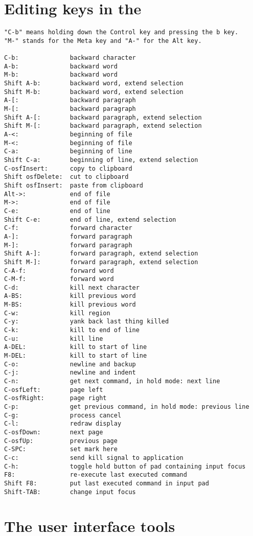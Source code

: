 \chapter{Editing keys in the \IP}
\begin{verbatim}
"C-b" means holding down the Control key and pressing the b key.
"M-" stands for the Meta key and "A-" for the Alt key.

C-b:              backward character
A-b:              backward word
M-b:              backward word
Shift A-b:        backward word, extend selection
Shift M-b:        backward word, extend selection
A-[:              backward paragraph
M-[:              backward paragraph
Shift A-[:        backward paragraph, extend selection
Shift M-[:        backward paragraph, extend selection
A-<:              beginning of file
M-<:              beginning of file
C-a:              beginning of line
Shift C-a:        beginning of line, extend selection
C-osfInsert:      copy to clipboard
Shift osfDelete:  cut to clipboard
Shift osfInsert:  paste from clipboard
Alt->:            end of file
M->:              end of file
C-e:              end of line
Shift C-e:        end of line, extend selection
C-f:              forward character
A-]:              forward paragraph
M-]:              forward paragraph
Shift A-]:        forward paragraph, extend selection
Shift M-]:        forward paragraph, extend selection
C-A-f:            forward word
C-M-f:            forward word
C-d:              kill next character
A-BS:             kill previous word
M-BS:             kill previous word
C-w:              kill region
C-y:              yank back last thing killed
C-k:              kill to end of line
C-u:              kill line
A-DEL:            kill to start of line
M-DEL:            kill to start of line
C-o:              newline and backup
C-j:              newline and indent
C-n:              get next command, in hold mode: next line
C-osfLeft:        page left
C-osfRight:       page right
C-p:              get previous command, in hold mode: previous line
C-g:              process cancel
C-l:              redraw display
C-osfDown:        next page
C-osfUp:          previous page
C-SPC:            set mark here
C-c:              send kill signal to application
C-h:              toggle hold button of pad containing input focus
F8:               re-execute last executed command
Shift F8:         put last executed command in input pad
Shift-TAB:        change input focus
\end{verbatim}

\chapter{The \MOTIF{} user interface tools}
